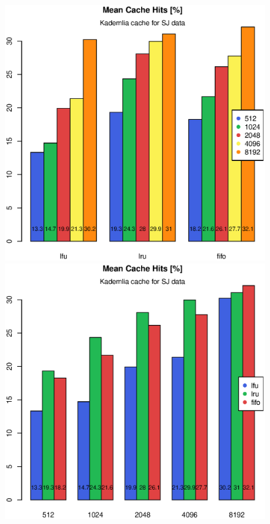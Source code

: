 \documentclass[a4paper,11pt]{scrartcl}
\begin{document}
\begin{figure}[h!]
\centering
\begin{minipage}{0.48\linewidth}
\centering
\includegraphics[width=0.9\linewidth]{img/tests/p2p_mean_sj_1.eps}
\end{minipage}
\begin{minipage}{0.48\linewidth}
\centering
\includegraphics[width=0.9\linewidth]{img/tests/p2p_mean_sj_2.eps}
\end{minipage}

\end{figure}
\end{document}
